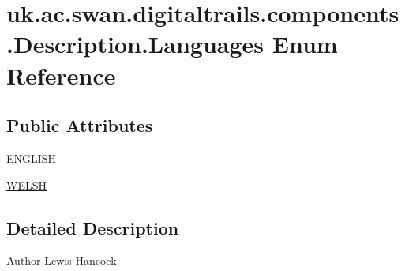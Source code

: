 \hypertarget{enumuk_1_1ac_1_1swan_1_1digitaltrails_1_1components_1_1_description_1_1_languages}{\section{uk.\+ac.\+swan.\+digitaltrails.\+components.\+Description.\+Languages Enum Reference}
\label{enumuk_1_1ac_1_1swan_1_1digitaltrails_1_1components_1_1_description_1_1_languages}
}
\subsection*{Public Attributes}
\begin{DoxyCompactItemize}
\item 
\hyperlink{enumuk_1_1ac_1_1swan_1_1digitaltrails_1_1components_1_1_description_1_1_languages_ae7a7797632b7148d9432d216e1ae8273}{E\+N\+G\+L\+I\+S\+H}
\item 
\hyperlink{enumuk_1_1ac_1_1swan_1_1digitaltrails_1_1components_1_1_description_1_1_languages_a9025caaf5ee7dae0600bc60c953beea9}{W\+E\+L\+S\+H}
\end{DoxyCompactItemize}


\subsection{Detailed Description}
\begin{DoxyAuthor}{Author}
Lewis Hancock 
\end{DoxyAuthor}


